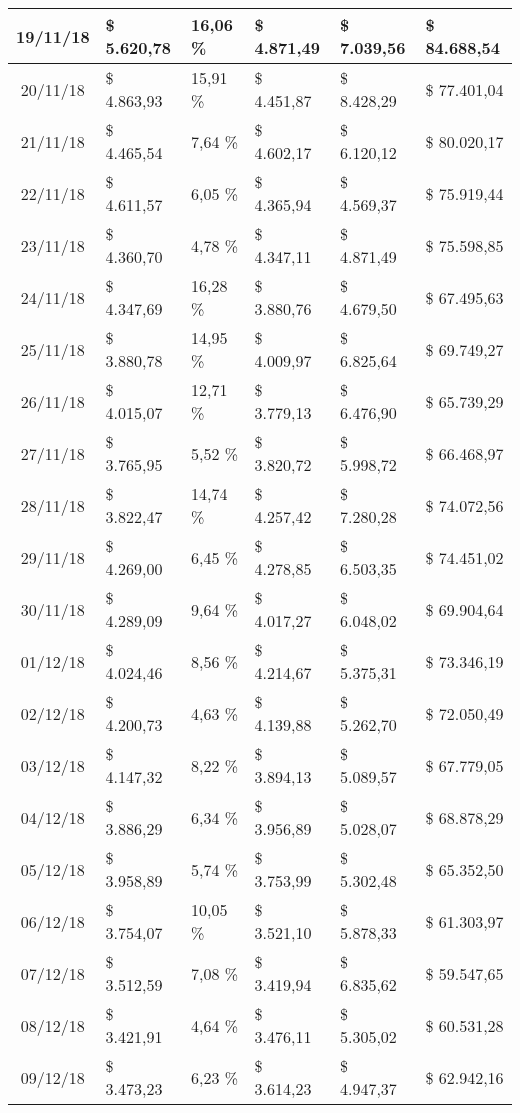 \begin{small}
\begin{longtable}{|c|l|l|l|l|l|}
19/11/18 & \$ 5.620,78 & 16,06 \% & \$ 4.871,49 & \$ 7.039,56 & \$ 84.688,54 \\ \hline
20/11/18 & \$ 4.863,93 & 15,91 \% & \$ 4.451,87 & \$ 8.428,29 & \$ 77.401,04 \\ \hline
21/11/18 & \$ 4.465,54 & 7,64 \% & \$ 4.602,17 & \$ 6.120,12 & \$ 80.020,17 \\ \hline
22/11/18 & \$ 4.611,57 & 6,05 \% & \$ 4.365,94 & \$ 4.569,37 & \$ 75.919,44 \\ \hline
23/11/18 & \$ 4.360,70 & 4,78 \% & \$ 4.347,11 & \$ 4.871,49 & \$ 75.598,85 \\ \hline
24/11/18 & \$ 4.347,69 & 16,28 \% & \$ 3.880,76 & \$ 4.679,50 & \$ 67.495,63 \\ \hline
25/11/18 & \$ 3.880,78 & 14,95 \% & \$ 4.009,97 & \$ 6.825,64 & \$ 69.749,27 \\ \hline
26/11/18 & \$ 4.015,07 & 12,71 \% & \$ 3.779,13 & \$ 6.476,90 & \$ 65.739,29 \\ \hline
27/11/18 & \$ 3.765,95 & 5,52 \% & \$ 3.820,72 & \$ 5.998,72 & \$ 66.468,97 \\ \hline
28/11/18 & \$ 3.822,47 & 14,74 \% & \$ 4.257,42 & \$ 7.280,28 & \$ 74.072,56 \\ \hline
29/11/18 & \$ 4.269,00 & 6,45 \% & \$ 4.278,85 & \$ 6.503,35 & \$ 74.451,02 \\ \hline
30/11/18 & \$ 4.289,09 & 9,64 \% & \$ 4.017,27 & \$ 6.048,02 & \$ 69.904,64 \\ \hline
01/12/18 & \$ 4.024,46 & 8,56 \% & \$ 4.214,67 & \$ 5.375,31 & \$ 73.346,19 \\ \hline
02/12/18 & \$ 4.200,73 & 4,63 \% & \$ 4.139,88 & \$ 5.262,70 & \$ 72.050,49 \\ \hline
03/12/18 & \$ 4.147,32 & 8,22 \% & \$ 3.894,13 & \$ 5.089,57 & \$ 67.779,05 \\ \hline
04/12/18 & \$ 3.886,29 & 6,34 \% & \$ 3.956,89 & \$ 5.028,07 & \$ 68.878,29 \\ \hline
05/12/18 & \$ 3.958,89 & 5,74 \% & \$ 3.753,99 & \$ 5.302,48 & \$ 65.352,50 \\ \hline
06/12/18 & \$ 3.754,07 & 10,05 \% & \$ 3.521,10 & \$ 5.878,33 & \$ 61.303,97 \\ \hline
07/12/18 & \$ 3.512,59 & 7,08 \% & \$ 3.419,94 & \$ 6.835,62 & \$ 59.547,65 \\ \hline
08/12/18 & \$ 3.421,91 & 4,64 \% & \$ 3.476,11 & \$ 5.305,02 & \$ 60.531,28 \\ \hline
09/12/18 & \$ 3.473,23 & 6,23 \% & \$ 3.614,23 & \$ 4.947,37 & \$ 62.942,16 \\ \hline

\end{longtable}
\end{small}
